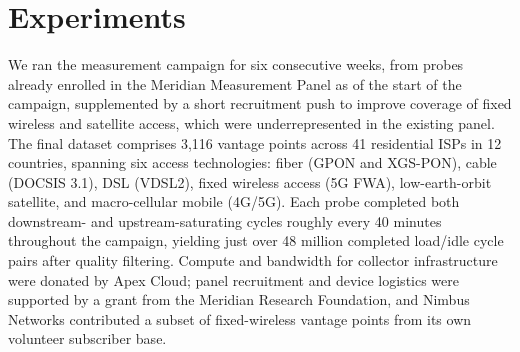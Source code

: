 \section{Experiments}
\label{sec:experiments}
We ran the measurement campaign for six consecutive weeks, from probes already enrolled
in the Meridian Measurement Panel as of the start of the campaign, supplemented by a
short recruitment push to improve coverage of fixed wireless and satellite access, which
were underrepresented in the existing panel. The final dataset comprises 3{,}116 vantage
points across 41 residential ISPs in 12 countries, spanning six access technologies:
fiber (GPON and XGS-PON), cable (DOCSIS 3.1), DSL (VDSL2), fixed wireless access (5G
FWA), low-earth-orbit satellite, and macro-cellular mobile (4G/5G). Each probe completed
both downstream- and upstream-saturating cycles roughly every 40 minutes throughout the
campaign, yielding just over 48 million completed load/idle cycle pairs after quality
filtering. Compute and bandwidth for collector infrastructure were donated by Apex Cloud;
panel recruitment and device logistics were supported by a grant from the Meridian
Research Foundation, and Nimbus Networks contributed a subset of fixed-wireless vantage
points from its own volunteer subscriber base.
